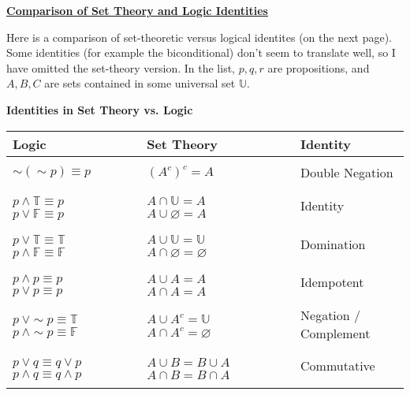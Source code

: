 \documentclass[11pt]{article}
\begin{document}
\bigskip
\begin{center}\underline{\bf \Large Comparison of Set Theory and Logic Identities}\end{center}

\bigskip
Here is a comparison of set-theoretic versus logical identites (on the next page). Some 
identities (for example the biconditional) don't seem to translate well, 
so I have omitted the set-theory version. In the list, 
$p, q, r$ are propositions, and $A,B, C$ are sets contained in some universal set $\mathbb{U}$. 


\newpage
{}

\begin{center}
    {\bf Identities in Set Theory vs. Logic}

\begin{tabular}{l|l|l}
\toprule
Logic                    & Set Theory                 & Identity \\
\midrule
\phantom{h} & \phantom{h} & \phantom{h} \\
$\sim (\sim p) \equiv p$ &  $(A^c)^c = A$             & Double Negation \\
\phantom{h} & \phantom{h} & \phantom{h} \\
$p \wedge \mathbb{T} \equiv p$ \ \ \ \ $p \vee \mathbb{F} \equiv p$  
& $A \cap \mathbb{U} = A$ \ \ \ \ $A \cup \varnothing = A$ 
&Identity \\
\phantom{h} & \phantom{h} & \phantom{h} \\
$p \vee \mathbb{T} \equiv \mathbb{T}$ \ \ \ \ $p \wedge \mathbb{F} \equiv \mathbb{F}$ 
& $A \cup \mathbb{U} = \mathbb{U}$ \ \ \ \ $A \cap \mathbb{\varnothing} = \varnothing$ 
&Domination \\
\phantom{h} & \phantom{h} & \phantom{h} \\
$p \wedge p \equiv p$ \ \ \ \ $p \vee p \equiv p$ 
& $A \cup A = A$  \ \ \ \ $A \cap A = A$ 
&Idempotent \\
\phantom{h} & \phantom{h} & \phantom{h} \\
$p \ \vee \sim p \equiv \mathbb{T}$ \ \ \ \ $p \ \wedge \sim p \equiv \mathbb{F}$ 
& $A \cup A^c = \mathbb{U}$ \ \ \ \ $A \cap A^c = \varnothing$
&Negation / Complement \\
\phantom{h} & \phantom{h} & \phantom{h} \\
$p \vee q \equiv q \vee p$ \ \ \ \ $p \wedge q \equiv q \wedge p$ 
&$A \cup B = B \cup A$ \ \ \ \ $A \cap B = B \cap A$
&Commutative \\
\phantom{h} & \phantom{h} & \phantom{h} \\

\end{tabular}
\end{center}
\end{document}
